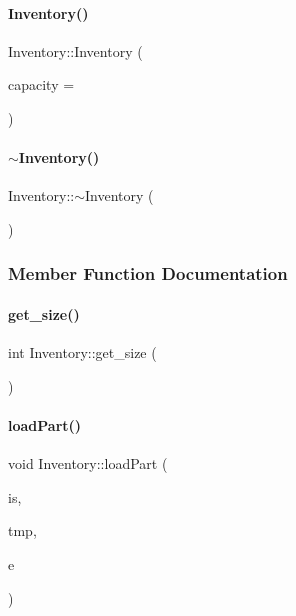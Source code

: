\paragraph{\texorpdfstring{Inventory()}{Inventory()}}
{\footnotesize\ttfamily Inventory\+::\+Inventory (\begin{DoxyParamCaption}\item[{size\+\_\+t}]{capacity = {} }\end{DoxyParamCaption})\hspace{0.3cm}{\ttfamily [inline]}}

\mbox{\label{class_inventory_a6c6dfcb6d977c74a7abf46809e892e3d}} 
\paragraph{\texorpdfstring{$\sim$Inventory()}{~Inventory()}}
{\footnotesize\ttfamily Inventory\+::$\sim$\+Inventory (\begin{DoxyParamCaption}{ }\end{DoxyParamCaption})\hspace{0.3cm}{\ttfamily [inline]}}



\subsubsection{Member Function Documentation}
\mbox{\label{class_inventory_a3ccacc9422b01b2c17836ca804bcaafc}} 
\paragraph{\texorpdfstring{get\_size()}{get\_size()}}
{\footnotesize\ttfamily int Inventory\+::get\+\_\+size (\begin{DoxyParamCaption}{ }\end{DoxyParamCaption})\hspace{0.3cm}{\ttfamily [inline]}}

\mbox{\label{class_inventory_a9dd64f268a7a5cca611b5f749ec33f96}} 
\paragraph{\texorpdfstring{loadPart()}{loadPart()}}
{\footnotesize\ttfamily void Inventory\+::load\+Part (\begin{DoxyParamCaption}\item[{std\+::istream \&}]{is,  }\item[{\mbox{\hyperlink{struct_temp_input}{Temp\+Input}} \&}]{tmp,  }\item[{\mbox{\hyperlink{_inventory_8h_abddff37837f171d72a2e16a1448a3943}{enum\+Part}}}]{e }\end{DoxyParamCaption})}

